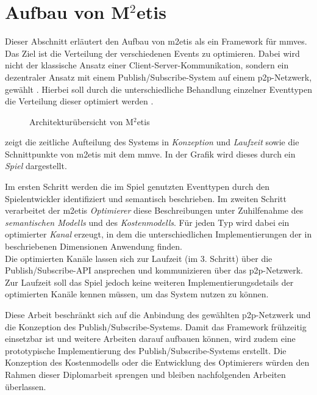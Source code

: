 \section{Aufbau von M$^2$etis}
\label{chap:aufbau_metis}

Dieser Abschnitt erläutert den Aufbau von \ac{m2etis} als ein Framework für \acp{mmve}. Das Ziel ist die Verteilung der verschiedenen Events zu optimieren. Dabei wird nicht der klassische Ansatz einer Client-Server-Kommunikation, sondern ein dezentraler Ansatz mit einem Publish/Subscribe-System auf einem \ac{p2p}-Netzwerk, gewählt \cite{Fischer2010a}. Hierbei soll durch die unterschiedliche Behandlung einzelner Eventtypen die Verteilung dieser optimiert werden \cite{Fischer2010Event}.

\begin{figure}[htbp]
\centering
{}
\caption{Architekturübersicht von M$^2$etis}
\label{fig:metis_aufbau}
\end{figure}

 zeigt die zeitliche Aufteilung des Systems in \emph{Konzeption} und \emph{Laufzeit} sowie die Schnittpunkte von \ac{m2etis} mit dem \ac{mmve}. In der Grafik wird dieses durch ein \emph{Spiel} dargestellt.

Im ersten Schritt werden die im Spiel genutzten Eventtypen durch den Spielentwickler identifiziert und semantisch beschrieben. Im zweiten Schritt verarbeitet der \ac{m2etis} \emph{Optimierer} diese Beschreibungen unter Zuhilfenahme des \emph{semantischen Modells} und des \emph{Kostenmodells}. Für jeden Typ wird dabei ein optimierter \emph{Kanal} erzeugt, in dem die unterschiedlichen Implementierungen der in \cite{Fischer2010a} beschriebenen Dimensionen Anwendung finden.\\
Die optimierten Kanäle lassen sich zur Laufzeit (im 3. Schritt) über die Publish/Subscribe-API ansprechen und kommunizieren über das \ac{p2p}-Netzwerk. Zur Laufzeit soll das Spiel jedoch keine weiteren Implementierungsdetails der optimierten Kanäle kennen müssen, um das System nutzen zu können.

Diese Arbeit beschränkt sich auf die Anbindung des gewählten \ac{p2p}-Netzwerk und die Konzeption des Publish/Subscribe-Systems. Damit das Framework frühzeitig einsetzbar ist und weitere Arbeiten darauf aufbauen können, wird zudem eine prototypische Implementierung des Publish/Subscribe-Systems erstellt. Die Konzeption des Kostenmodells oder die Entwicklung des Optimierers würden den Rahmen dieser Diplomarbeit sprengen und bleiben nachfolgenden Arbeiten überlassen.
